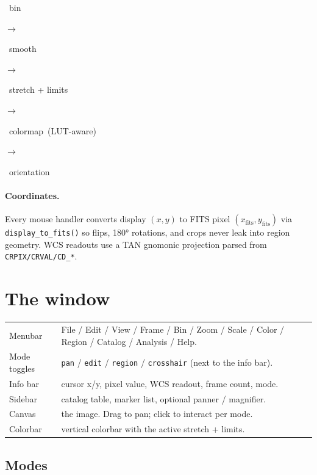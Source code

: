\documentclass[11pt,a4paper]{article}
\begin{document}
\begin{center}
\sffamily
\colorbox{accent!10!paper}{\strut\ bin\ } $\rightarrow$
\colorbox{accent!10!paper}{\strut\ smooth\ } $\rightarrow$
\colorbox{accent!10!paper}{\strut\ stretch + limits\ } $\rightarrow$
\colorbox{accent!10!paper}{\strut\ colormap\ (LUT-aware)\ } $\rightarrow$
\colorbox{accent!10!paper}{\strut\ orientation\ }
\end{center}

\paragraph{Coordinates.} Every mouse handler converts display $(x, y)$ to
FITS pixel $(x_{\text{fits}}, y_{\text{fits}})$ via
\texttt{display\_to\_fits()} so flips, 180° rotations, and crops never
leak into region geometry. WCS readouts use a TAN gnomonic projection
parsed from \texttt{CRPIX/CRVAL/CD\_*}.

\section{The window}

\begin{tabular}{@{}>{\sffamily}lp{}@{}}
\toprule
Menubar      & File / Edit / View / Frame / Bin / Zoom / Scale / Color /
               Region / Catalog / Analysis / Help. \\
Mode toggles & \texttt{pan} / \texttt{edit} / \texttt{region} /
               \texttt{crosshair} (next to the info bar). \\
Info bar     & cursor x/y, pixel value, WCS readout, frame count, mode. \\
Sidebar      & catalog table, marker list, optional panner / magnifier. \\
Canvas       & the image. Drag to pan; click to interact per mode. \\
Colorbar     & vertical colorbar with the active stretch + limits. \\
\bottomrule
\end{tabular}

\subsection{Modes}
\end{document}
